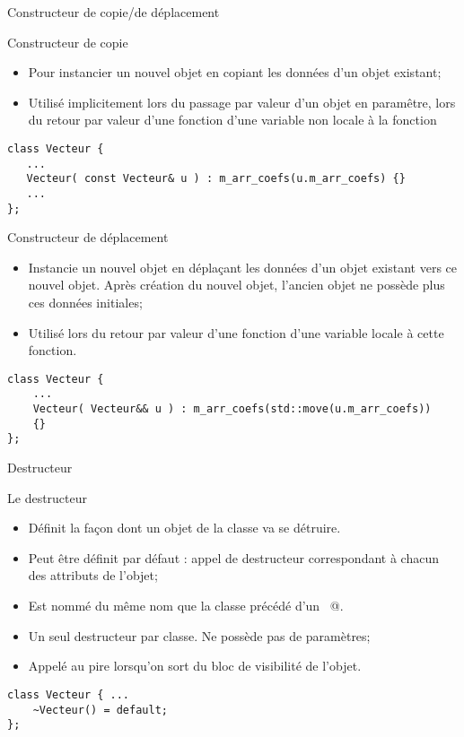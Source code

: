 \documentclass[handout,10pt]{beamer}
\begin{document}
\begin{frame}[fragile]{Constructeur de copie/de déplacement}
\tiny
\begin{block}{Constructeur de copie}
\begin{itemize}
\item Pour instancier un nouvel objet en copiant les données d'un objet existant;
\item Utilisé implicitement lors du passage par valeur d'un objet en paramêtre, lors du retour par valeur  d'une fonction d'une variable non locale à la fonction
\end{itemize}
\begin{lstlisting}
class Vecteur {
   ...
   Vecteur( const Vecteur& u ) : m_arr_coefs(u.m_arr_coefs) {}
   ...
};
\end{lstlisting}
\end{block}

\begin{block}{Constructeur de déplacement}
\begin{itemize}
\item Instancie un nouvel objet en déplaçant les données d'un objet existant vers ce nouvel objet. Après création du nouvel objet,
l'ancien objet ne possède plus ces données initiales;
\item Utilisé lors du retour par valeur d'une fonction d'une variable locale à cette fonction.
\end{itemize}
\begin{lstlisting}
class Vecteur {
    ...
    Vecteur( Vecteur&& u ) : m_arr_coefs(std::move(u.m_arr_coefs))
    {}
};
\end{lstlisting}
\end{block}
\end{frame}

\begin{frame}[fragile]{Destructeur}
\begin{block}{Le destructeur}
\begin{itemize}
\item Définit la façon dont un objet de la classe va se détruire.
\item Peut être définit par défaut : appel de destructeur correspondant à chacun des attributs de l'objet;
\item Est nommé du même nom que la classe précédé d'un \verb@~@.
\item Un seul destructeur par classe. Ne possède pas de paramètres;
\item Appelé au pire lorsqu'on sort du bloc de visibilité de l'objet.
\end{itemize}
\end{block}
\begin{lstlisting}
class Vecteur { ...
    ~Vecteur() = default;
};
\end{lstlisting}
\end{frame}
\end{document}
